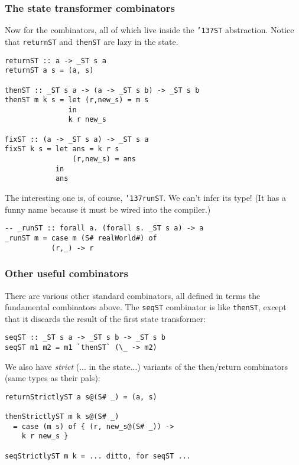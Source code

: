 \subsubsection{The state transformer combinators}

Now for the combinators, all of which live inside the \mbox{\tt {\char'137}ST}
abstraction.  Notice that \mbox{\tt returnST} and \mbox{\tt thenST} are lazy in the
state.
\begin{verbatim}
returnST :: a -> _ST s a
returnST a s = (a, s)

thenST :: _ST s a -> (a -> _ST s b) -> _ST s b
thenST m k s = let (r,new_s) = m s
               in 
               k r new_s

fixST :: (a -> _ST s a) -> _ST s a
fixST k s = let ans = k r s
                (r,new_s) = ans
            in
            ans
\end{verbatim}
The interesting one is, of course, \mbox{\tt {\char'137}runST}.  We can't infer its type!
(It has a funny name because it must be wired into the compiler.)
\begin{verbatim}
-- _runST :: forall a. (forall s. _ST s a) -> a
_runST m = case m (S# realWorld#) of
           (r,_) -> r
\end{verbatim}

\subsubsection{Other useful combinators}

There are various other standard combinators, all defined in terms the
fundamental combinators above. The \mbox{\tt seqST} combinator is like
\mbox{\tt thenST}, except that it discards the result of the first state
transformer:
\begin{verbatim}
seqST :: _ST s a -> _ST s b -> _ST s b
seqST m1 m2 = m1 `thenST` (\_ -> m2)
\end{verbatim}

We also have {\em strict} (... in the state...) variants of the
then/return combinators (same types as their pals):
\begin{verbatim}
returnStrictlyST a s@(S# _) = (a, s)

thenStrictlyST m k s@(S# _)
  = case (m s) of { (r, new_s@(S# _)) ->
    k r new_s }

seqStrictlyST m k = ... ditto, for seqST ...
\end{verbatim}

